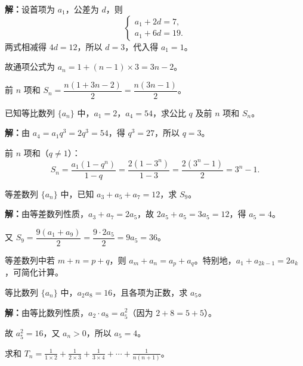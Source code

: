 \documentclass[12pt, a4paper]{ctexart}
\begin{document}
\noindent\textbf{解：}设首项为 $a_1$，公差为 $d$，则
\[
  \begin{cases} a_1 + 2d = 7,\\ a_1 + 6d = 19. \end{cases}
\]
两式相减得 $4d = 12$，所以 $d = 3$，代入得 $a_1 = 1$。

故通项公式为 $a_n = 1 + (n-1) \times 3 = 3n - 2$。

前 $n$ 项和 $S_n = \dfrac{n(1 + 3n - 2)}{2} = \dfrac{n(3n-1)}{2}$。

\begin{examplebox}[【例题2】等比数列基本运算]
已知等比数列 $\{a_n\}$ 中，$a_1 = 2$，$a_4 = 54$，求公比 $q$ 及前 $n$ 项和 $S_n$。
\end{examplebox}

\noindent\textbf{解：}由 $a_4 = a_1 q^3 = 2q^3 = 54$，得 $q^3 = 27$，所以 $q = 3$。

前 $n$ 项和（$q \neq 1$）：
\[
  S_n = \frac{a_1(1 - q^n)}{1 - q} = \frac{2(1 - 3^n)}{1 - 3} = \frac{2(3^n - 1)}{2} = 3^n - 1.
\]

\begin{examplebox}[【例题3】等差数列的性质应用]
等差数列 $\{a_n\}$ 中，已知 $a_3 + a_5 + a_7 = 12$，求 $S_9$。
\end{examplebox}

\noindent\textbf{解：}由等差数列性质，$a_3 + a_7 = 2a_5$，故 $2a_5 + a_5 = 3a_5 = 12$，得 $a_5 = 4$。

又 $S_9 = \dfrac{9(a_1 + a_9)}{2} = \dfrac{9 \cdot 2a_5}{2} = 9a_5 = 36$。

\begin{tipbox}[方法总结]
等差数列中若 $m + n = p + q$，则 $a_m + a_n = a_p + a_q$。特别地，$a_1 + a_{2k-1} = 2a_k$，可简化计算。
\end{tipbox}

\begin{examplebox}[【例题4】等比数列性质应用]
等比数列 $\{a_n\}$ 中，$a_2 a_8 = 16$，且各项为正数，求 $a_5$。
\end{examplebox}

\noindent\textbf{解：}由等比数列性质，$a_2 \cdot a_8 = a_5^2$（因为 $2 + 8 = 5 + 5$）。

故 $a_5^2 = 16$，又 $a_n > 0$，所以 $a_5 = 4$。

\begin{examplebox}[【例题5】裂项求和]
求和 $\displaystyle T_n = \frac{1}{1 \times 2} + \frac{1}{2 \times 3} + \frac{1}{3 \times 4} + \cdots + \frac{1}{n(n+1)}$。
\end{examplebox}
\end{document}
